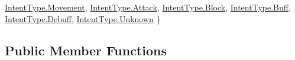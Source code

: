 \begin{DoxyCompactItemize}
\mbox{\hyperlink{class_spell_a602b82de554076b542544262e7a95f19a4642e767f9251fa40afadbc963f80b7a}{Intent\+Type.\+Movement}}, 
\mbox{\hyperlink{class_spell_a602b82de554076b542544262e7a95f19adcfafcb4323b102c7e204555d313ba0a}{Intent\+Type.\+Attack}}, 
\mbox{\hyperlink{class_spell_a602b82de554076b542544262e7a95f19ae1e4c8c9ccd9fc39c391da4bcd093fb2}{Intent\+Type.\+Block}}, 
\mbox{\hyperlink{class_spell_a602b82de554076b542544262e7a95f19a536e1a5d9f4fe868e6ea5ff628f51f25}{Intent\+Type.\+Buff}}, 
\newline
\mbox{\hyperlink{class_spell_a602b82de554076b542544262e7a95f19a941c9c4ecaa0bb3ab530f13b0078be01}{Intent\+Type.\+Debuff}}, 
\mbox{\hyperlink{class_spell_a602b82de554076b542544262e7a95f19a88183b946cc5f0e8c96b2e66e1c74a7e}{Intent\+Type.\+Unknown}}
 \}
\end{DoxyCompactItemize}
\subsection*{Public Member Functions}
